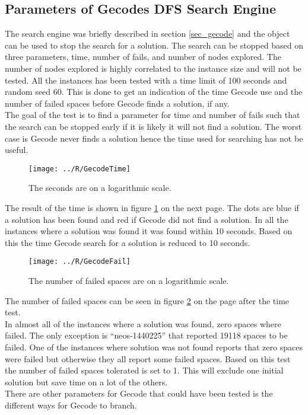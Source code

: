 \subsection{Parameters of Gecodes DFS Search Engine}
The search engine was briefly described in section \ref{sec_gecode} and the  object can be used to 
stop the search for a solution. The search can be stopped based on three parameters, time, number of fails, and number 
of nodes explored. The number of nodes explored is highly correlated to the instance size and will not be tested. All 
the instances has been tested with a time limit of 100 seconds and random seed 60. This is done to get an indication 
of the time Gecode use and the number of failed spaces before Gecode finds a solution, if any. \\ 
The goal of the test is to find a parameter for time and number of fails such that the search can be stopped early if 
it is likely it will not find a solution. The worst case is Gecode never finds a solution hence the time used for 
searching has not be useful. \\
\begin{figure}[!h]
\centering
\texttt{[image: ../R/GecodeTime]} \caption{The seconds are on a logarithmic 
scale.}\label{fig_gecodetime}
\end{figure}\noindent
The result of the time is shown in figure \ref{fig_gecodetime} on the next page. The dots are blue if a solution has 
been found and red if Gecode did not find a solution. In all the instances where a solution was found it was found 
within 10 seconds. Based on this the time Gecode search for a solution is reduced to 10 seconds. \\ 
\begin{figure}[!h]
\centering
\texttt{[image: ../R/GecodeFail]} \caption{The number of failed spaces are on a logarithmic 
scale.}\label{fig_gecodefail}
\end{figure}\noindent
The number of failed spaces can be seen in figure \ref{fig_gecodefail} on the page after the time test. \\ 
In almost all of the instances where a solution was found, zero spaces where failed. The only exception is 
``neos-1440225'' that reported 19118 spaces to be failed. One of the instances where solution was not found reports 
that zero spaces were failed but otherwise they all report some failed spaces. Based on this test the number of failed 
spaces tolerated is set to 1. This will exclude one initial solution but save time on a lot of the others. \\ 
There are other parameters for Gecode that could have been tested is the different ways for Gecode to branch. \\ 
\phantom{p. 1}
\clearpage

